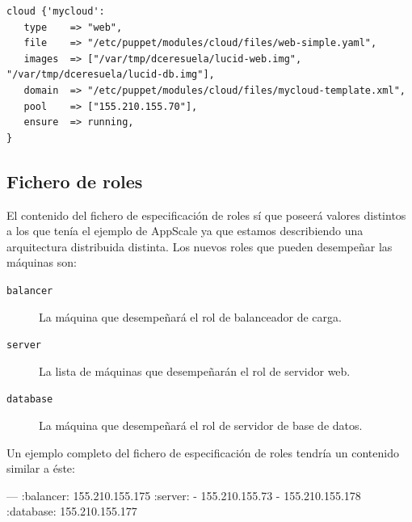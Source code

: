 \begin{lstlisting}
cloud {'mycloud':
   type    => "web",
   file    => "/etc/puppet/modules/cloud/files/web-simple.yaml",
   images  => ["/var/tmp/dceresuela/lucid-web.img", "/var/tmp/dceresuela/lucid-db.img"],
   domain  => "/etc/puppet/modules/cloud/files/mycloud-template.xml",
   pool    => ["155.210.155.70"],
   ensure  => running,
}
\end{lstlisting}

\subsection{Fichero de roles}

El contenido del fichero de especificación de roles sí que poseerá valores distintos a los que tenía el ejemplo de AppScale ya que estamos describiendo una arquitectura distribuida distinta. Los nuevos roles que pueden desempeñar las máquinas son:
\begin{description}
\item[\texttt{balancer}] La máquina que desempeñará el rol de balanceador de carga.
\item[\texttt{server}] La lista de máquinas que desempeñarán el rol de servidor web.
\item[\texttt{database}] La máquina que desempeñará el rol de servidor de base de datos.
\end{description}

Un ejemplo completo del fichero de especificación de roles tendría un contenido similar a éste:
\begin{yamlcode}
--- 
:balancer: 155.210.155.175
:server:
- 155.210.155.73
- 155.210.155.178
:database: 155.210.155.177
\end{yamlcode}



%   
%   
%   
%   
